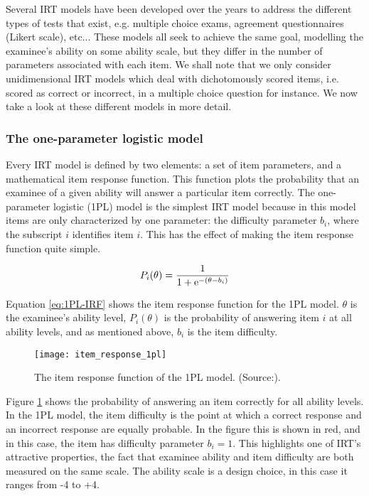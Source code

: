 Several IRT models have been developed over the years to address the different types of tests that exist, e.g. multiple choice exams, agreement questionnaires (Likert scale), etc... These models all seek to achieve the same goal, modelling the examinee's ability on some ability scale, but they differ in the number of parameters associated with each item. We shall note that we only consider unidimensional IRT models which deal with dichotomously scored items, i.e. scored as correct or incorrect, in a multiple choice question for instance. We now take a look at these different models in more detail.

\subsubsection{The one-parameter logistic model}
Every IRT model is defined by two elements: a set of item parameters, and a mathematical item response function. This function plots the probability that an examinee of a given ability will answer a particular item correctly. The one-parameter logistic (1PL) model is the simplest IRT model because in this model items are only characterized by one parameter: the difficulty parameter $b_i$, where the subscript $i$ identifies item $i$. This has the effect of making the item response function quite simple.

\begin{equation} \label{eq:1PL-IRF}
P_i(\theta) = \dfrac{1}{1 + \mathrm{e}^{-(\theta - b_i)}}
\end{equation}

Equation \eqref{eq:1PL-IRF} shows the item response function for the 1PL model. $\theta$ is the examinee's ability level, $P_i(\theta)$ is the probability of answering item $i$ at all ability levels, and as mentioned above, $b_i$ is the item difficulty.

\begin{figure}[H]
\centering
\texttt{[image: item\_response\_1pl]}
\caption{The item response function of the 1PL model. (Source:\cite{Visual-IRT}).}
\label{fig:item_response_1pl}
\end{figure}

Figure \ref{fig:item_response_1pl} shows the probability of answering an item correctly for all ability levels. In the 1PL model, the item difficulty is the point at which a correct response and an incorrect response are equally probable. In the figure this is shown in red, and in this case, the item has difficulty parameter $b_i=1$. This highlights one of IRT's attractive properties, the fact that examinee ability and item difficulty are both measured on the same scale. The ability scale is a design choice, in this case it ranges from -4 to +4.

